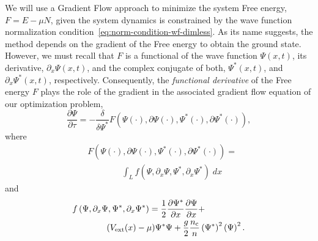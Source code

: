 \documentclass[twocolumn,showpacs,showkeys,preprintnumbers,superscriptaddress, pra, 10pt, aps]{revtex4-2}
\begin{document}
We will use a Gradient Flow approach to minimize the system Free energy, $F = E - \mu N$, given the
system dynamics is constrained by the wave function normalization
condition~\eqref{eq:norm-condition-wf-dimless}. As its name suggests, the method depends on the
gradient of the Free energy to obtain the ground state. However, we must recall that $F$ is a
functional of the wave function $\Psi(x, t)$, its derivative, $\partial_x \Psi(x, t)$, and the
complex conjugate of both, $\Psi^*(x, t)$, and $\partial_x \Psi^*(x, t)$, respectively.
Consequently, the \emph{functional derivative} of the Free energy $F$ plays the role of the gradient
in the associated gradient flow equation of our optimization problem,
%
\begin{equation}
  \label{eq:functional-gradient-flow}
  \frac{\partial \Psi}{\partial \tau} = -\frac{\delta}{\delta {\Psi}^*} F \left(\Psi(\cdot), \partial \Psi(\cdot), {\Psi}^*(\cdot), \partial {\Psi}^*(\cdot) \right),
\end{equation}
%
where
%
\begin{align}
  \nonumber
   & F \left(\Psi(\cdot), \partial \Psi(\cdot), {\Psi}^*(\cdot), \partial {\Psi}^*(\cdot) \right) =    \\
  \label{eq:functional-free-energy}
   & \qquad \qquad \int_{L} f \left(\Psi, \partial_x \Psi, {\Psi}^*, \partial_x {\Psi}^* \right) \; dx
\end{align}
%
and
%
\begin{align}
  \nonumber
   & f \left(\Psi, \partial_x \Psi, {\Psi}^*, \partial_x {\Psi}^* \right)  = \frac{1}{2} \frac{\partial {\Psi^*}}{\partial x} \frac{\partial \Psi}{\partial x} + \\
  \label{eq:functional-free-energy-integrand}
   & \qquad \qquad (V_\mathrm{ext}(x)- \mu)  \Psi^* \Psi + \frac{g}{2} \frac{n_{\mathrm{c}}}{n} \left(\Psi^*\right)^2 \left(\Psi\right)^2.
\end{align}
\end{document}
